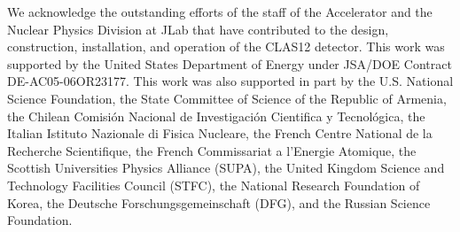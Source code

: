 \documentclass[final,3p,twocolumn]{elsarticle}
\begin{document}
We acknowledge the outstanding efforts of the staff of the Accelerator and the Nuclear Physics Division at JLab
that have contributed to the design, construction, installation, and operation of the CLAS12 detector. This work was
supported by the United States Department of Energy under JSA/DOE Contract DE-AC05-06OR23177. This work
was also supported in part by the U.S. National Science Foundation, the State Committee of Science of the Republic
of Armenia, the Chilean Comisi\'on Nacional de Investigaci\'on Cientifica y Tecnol\'ogica, the Italian Istituto
Nazionale di Fisica Nucleare, the French Centre National de la Recherche Scientifique, the French Commissariat a
l'Energie Atomique, the Scottish Universities Physics Alliance (SUPA), the United Kingdom Science and Technology
Facilities Council (STFC), the National Research Foundation of Korea, the Deutsche Forschungsgemeinschaft (DFG),
and the Russian Science Foundation. 

\vfil
\eject
\end{document}
